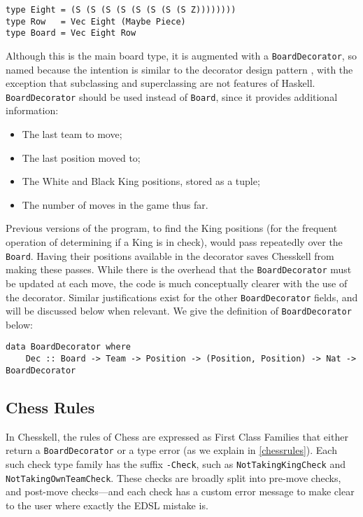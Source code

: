 \documentclass[12pt, a4paper, bibliography=totocnumbered]{scrreprt}
\newcommand{\inline}[1]{\lstinline[basicstyle=\ttfamily\footnotesize]{#1}}
\begin{document}
\begin{lstlisting}
type Eight = (S (S (S (S (S (S (S (S Z))))))))
type Row   = Vec Eight (Maybe Piece)
type Board = Vec Eight Row
\end{lstlisting}

Although this is the main board type, it is augmented with a \inline{BoardDecorator}, so named because the intention is similar to the decorator design pattern \cite{decorator}, with the exception that subclassing and superclassing are not features of Haskell. \inline{BoardDecorator} should be used instead of \inline{Board}, since it provides additional information:

\begin{itemize}
    \item The last team to move;
    \item The last position moved to;
    \item The White and Black King positions, stored as a tuple;
    \item The number of moves in the game thus far.
\end{itemize}

Previous versions of the program, to find the King positions (for the frequent operation of determining if a King is in check), would pass repeatedly over the \inline{Board}. Having their positions available in the decorator saves Chesskell from making these passes. While there is the overhead that the \inline{BoardDecorator} must be updated at each move, the code is much conceptually clearer with the use of the decorator. Similar justifications exist for the other \inline{BoardDecorator} fields, and will be discussed below when relevant. We give the definition of \inline{BoardDecorator} below:

\begin{lstlisting}
data BoardDecorator where
    Dec :: Board -> Team -> Position -> (Position, Position) -> Nat -> BoardDecorator
\end{lstlisting}

\subsection{Chess Rules}

In Chesskell, the rules of Chess are expressed as First Class Families that either return a \inline{BoardDecorator} or a type error (as we explain in \cref{chessrules}). Each such check type family has the suffix \inline{-Check}, such as \inline{NotTakingKingCheck} and \inline{NotTakingOwnTeamCheck}. These checks are broadly split into pre-move checks, and post-move checks---and each check has a custom error message to make clear to the user where exactly the EDSL mistake is.
\end{document}
